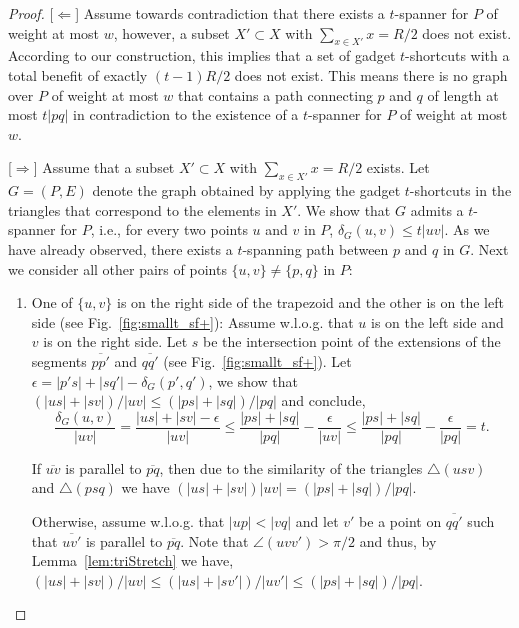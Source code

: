 \documentclass[a4paper]{llncs}
\begin{document}
\begin{proof}

[$\Leftarrow$] Assume towards contradiction that 
there exists a $t$-spanner for $P$ of weight at most $w$, however, 
a subset $X'\subset X$ with $\sum_{x \in X'} x =R/2$ does not exist. 
According to our construction, this implies that a set of gadget $t$-shortcuts 
with a total benefit of exactly $(t-1)R/2$ does not exist. 
This means there is no graph over $P$
of weight at most $w$ that contains a path connecting $p$ and $q$ of length at most $t|pq|$ 
in contradiction to the existence of a $t$-spanner for $P$ of weight at most $w$.

[$\Rightarrow$] Assume that a subset $X'\subset X$ with $\sum_{x \in X'} x =R/2$ exists.
Let $G=(P,E)$ denote the graph obtained by applying the gadget $t$-shortcuts
in the triangles that correspond to the elements in $X'$.
We show that $G$ admits a $t$-spanner for $P$, i.e., 
for every two points $u$ and $v$ in $P$, $\delta_G(u,v)\leq t|uv|$.
As we have already observed, there exists a $t$-spanning path between $p$ and $q$ in $G$.
Next we consider all other pairs of points $\{u,v\}\neq \{p,q\}$ in $P$:
\begin{enumerate}

\item One of $\{u,v\}$ is on the right side of the trapezoid 
and the other is on the left side (see Fig.~\ref{fig:smallt_sf+}):
Assume w.l.o.g. that $u$ is on the left side and $v$ is on the right side.
Let $s$ be the intersection point of the extensions of the segments $\overline{pp'}$ and $\overline{qq'}$
(see Fig.~\ref{fig:smallt_sf+}).
Let $\epsilon=|p's|+|sq'|-\delta_G(p',q')$,
we show that $(|us|+|sv|)/|uv| \leq (|ps|+|sq|)/|pq|$
and conclude,
$$\frac{\delta_G(u,v)}{|uv|} = \frac{|us|+|sv|-\epsilon}{|uv|} \leq 
\frac{|ps|+|sq|}{|pq|}-\frac{\epsilon}{|uv|} \leq \frac{|ps|+|sq|}{|pq|}-\frac{\epsilon}{|pq|}= t.$$

If $\overline{uv}$ is parallel to $\overline{pq}$, then 
due to the similarity of the triangles $\triangle(usv)$ and $\triangle(psq)$
we have $(|us|+|sv|)|uv| = (|ps|+|sq|)/|pq|$.

Otherwise, assume w.l.o.g. that $|up|<|vq|$ and let $v'$ be a point
on $\overline{qq'}$ such that $\overline{uv'}$ is parallel to $\overline{pq}$.
Note that $\angle(uvv')>\pi/2$ and thus, by Lemma~\ref{lem:triStretch} 
we have, $(|us|+|sv|)/|uv| \leq (|us|+|sv'|)/|uv'| \leq (|ps|+|sq|)/|pq|$.



\end{enumerate}
\end{proof}
\end{document}
